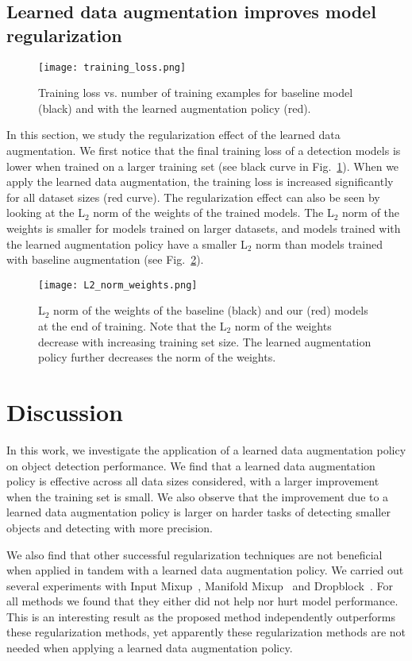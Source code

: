 \documentclass[10pt,twocolumn,letterpaper]{article}
\begin{document}
\subsection{Learned data augmentation improves model regularization}
\begin{figure}[h!]
\centering
\texttt{[image: training\_loss.png]}
\caption{Training loss vs. number of training examples for baseline model (black) and with the learned augmentation policy (red).  
}
\label{fig:training_loss}
\end{figure}


In this section, we study the regularization effect of the learned data augmentation. We first notice that the final training loss of a detection models is lower when trained on a larger training set (see black curve in Fig.~\ref{fig:training_loss}). When we apply the learned data augmentation, the training loss is increased significantly for all dataset sizes (red curve). The  regularization effect can also be seen by looking at the L$_2$ norm of the weights of the trained models. The L$_2$ norm of the weights is smaller for models trained on larger datasets, and models trained with the learned augmentation policy have a smaller L$_2$ norm than models trained with baseline augmentation (see Fig.~\ref{fig:l2_norm}). 

\begin{figure}[h!]
\centering
\texttt{[image: L2\_norm\_weights.png]}
\caption{L$_2$ norm of the weights of the baseline (black) and our (red) models at the end of training. Note that the L$_2$ norm of the weights decrease with increasing training set size. The learned augmentation policy further decreases the norm of the weights.  
}
\label{fig:l2_norm}
\end{figure} \section{Discussion}
In this work, we investigate the application of a learned data augmentation policy on object detection performance. We find that a learned data augmentation policy is effective across all data sizes considered, with a larger improvement when the training set is small. We also observe that the improvement due to a learned data augmentation policy is larger on harder tasks of detecting smaller objects and detecting with more precision. 

We also find that other successful regularization techniques are not beneficial when applied in tandem with a learned data augmentation policy. We carried out several experiments with Input Mixup~\cite{zhang2017mixup}, Manifold Mixup~\cite{verma2018manifold} and Dropblock~\cite{ghiasi2018dropblock}. For all methods we found that they either did not help nor hurt model performance. This is an interesting result as the proposed method independently outperforms these regularization methods, yet apparently these regularization methods are not needed when applying a learned data augmentation policy.
\end{document}
